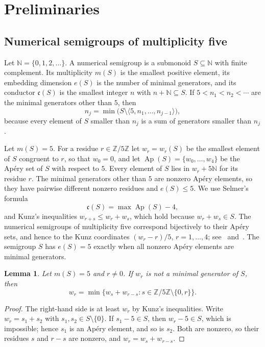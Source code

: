 \documentclass{amsart}
\newtheorem{lemma}[theorem]{Lemma}
\theoremstyle{definition}
\theoremstyle{remark}
\numberwithin{equation}{section}
\newcommand{\N}{\mathbb{N}}
\newcommand{\Z}{\mathbb{Z}}
\newcommand{\Ap}{\operatorname{Ap}}
\newcommand{\cond}{\mathfrak{c}}
\newcommand{\gen}[1]{\langle #1\rangle}
\begin{document}
\section{Preliminaries}\label{sec:prelim}

\subsection{Numerical semigroups of multiplicity five}
Let $\N=\{0,1,2,\dots\}$. A numerical semigroup is a submonoid $S\subseteq\N$ with finite complement. Its multiplicity $m(S)$ is the smallest positive element, its embedding dimension $e(S)$ is the number of minimal generators, and its conductor $\cond(S)$ is the smallest integer $n$ with $n+\N\subseteq S$. If $5<n_1<n_2<\cdots$ are the minimal generators other than $5$, then
\begin{equation}\label{eq:nextgen}
n_j=\min\bigl(S\setminus\gen{5,n_1,\dots,n_{j-1}}\bigr),
\end{equation}
because every element of $S$ smaller than $n_j$ is a sum of generators smaller than $n_j$.

Let $m(S)=5$. For a residue $r\in\Z/5\Z$ let $w_r=w_r(S)$ be the smallest element of $S$ congruent to $r$, so that $w_0=0$, and let $\Ap(S)=\{w_0,\dots,w_4\}$ be the Ap\'ery set of $S$ with respect to $5$. Every element of $S$ lies in $w_r+5\N$ for its residue $r$. The minimal generators other than $5$ are nonzero Ap\'ery elements, so they have pairwise different nonzero residues and $e(S)\le 5$. We use Selmer's formula~\cite{RGS}
\begin{equation}\label{eq:selmer}
\cond(S)=\max\Ap(S)-4,
\end{equation}
and Kunz's inequalities $w_{r+s}\le w_r+w_s$, which hold because $w_r+w_s\in S$. The numerical semigroups of multiplicity five correspond bijectively to their Ap\'ery sets, and hence to the Kunz coordinates $(w_r-r)/5$, $r=1,\dots,4$; see~\cite{Kun} and~\cite[Proposition~1 and Remark~4.1]{Mon}. The semigroup $S$ has $e(S)=5$ exactly when all nonzero Ap\'ery elements are minimal generators.

\begin{lemma}\label{lem:decompose}
Let $m(S)=5$ and $r\ne0$. If $w_r$ is not a minimal generator of $S$, then
\[
w_r=\min\{w_s+w_{r-s}: s\in\Z/5\Z\setminus\{0,r\}\}.
\]
\end{lemma}

\begin{proof}
The right-hand side is at least $w_r$ by Kunz's inequalities. Write $w_r=s_1+s_2$ with $s_1,s_2\in S\setminus\{0\}$. If $s_1-5\in S$, then $w_r-5\in S$, which is impossible; hence $s_1$ is an Ap\'ery element, and so is $s_2$. Both are nonzero, so their residues $s$ and $r-s$ are nonzero, and $w_r=w_s+w_{r-s}$.
\end{proof}
\end{document}
